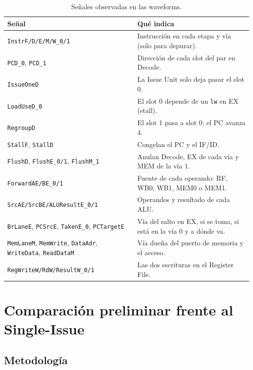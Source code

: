 \documentclass[12pt,a4paper]{article}
\begin{document}
\begin{table}[H]
\centering
\small
\begin{tabularx}{\linewidth}{lX}
\toprule
\textbf{Señal} & \textbf{Qué indica} \\
\midrule
\texttt{InstrF/D/E/M/W\_0/1} & Instrucción en cada etapa y vía (solo para depurar). \\
\texttt{PCD\_0}, \texttt{PCD\_1} & Dirección de cada slot del par en Decode. \\
\texttt{IssueOneD} & La Issue Unit solo deja pasar el slot 0. \\
\texttt{LoadUseD\_0} & El slot 0 depende de un \texttt{lw} en EX (stall). \\
\texttt{RegroupD} & El slot 1 pasa a slot 0; el PC avanza 4. \\
\texttt{StallF}, \texttt{StallD} & Congelan el PC y el IF/ID. \\
\texttt{FlushD}, \texttt{FlushE\_0/1}, \texttt{FlushM\_1} & Anulan Decode, EX de cada vía y MEM de la vía 1. \\
\texttt{ForwardAE/BE\_0/1} & Fuente de cada operando: RF, WB0, WB1, MEM0 o MEM1. \\
\texttt{SrcAE/SrcBE/ALUResultE\_0/1} & Operandos y resultado de cada ALU. \\
\texttt{BrLaneE}, \texttt{PCSrcE}, \texttt{TakenE\_0}, \texttt{PCTargetE} & Vía del salto en EX, si se toma, si está en la vía 0 y a dónde va. \\
\texttt{MemLaneM}, \texttt{MemWrite}, \texttt{DataAdr}, \texttt{WriteData}, \texttt{ReadDataM} & Vía dueña del puerto de memoria y el acceso. \\
\texttt{RegWriteW/RdW/ResultW\_0/1} & Las dos escrituras en el Register File. \\
\bottomrule
\end{tabularx}
\caption{Señales observadas en las waveforms.}
\label{tab:senales}
\end{table}

\FloatBarrier
\section{Comparación preliminar frente al Single-Issue}
\label{sec:comp}

\subsection{Metodología}
\end{document}
